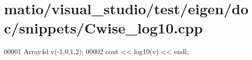\hypertarget{matio_2visual__studio_2test_2eigen_2doc_2snippets_2_cwise__log10_8cpp_source}{}\section{matio/visual\+\_\+studio/test/eigen/doc/snippets/\+Cwise\+\_\+log10.cpp}
\label{matio_2visual__studio_2test_2eigen_2doc_2snippets_2_cwise__log10_8cpp_source}

\begin{DoxyCode}
00001 Array4d v(-1,0,1,2);
00002 cout << log10(v) << endl;
\end{DoxyCode}
